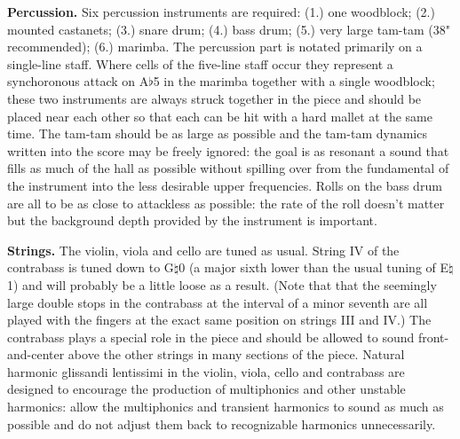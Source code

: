 \textbf{Percussion.} Six percussion instruments are required: (1.) one
woodblock; (2.) mounted castanets; (3.) snare drum; (4.) bass drum; (5.) very
large tam-tam (38" recommended); (6.) marimba. The percussion part is notated
primarily on a single-line staff. Where cells of the five-line staff occur they
represent a synchoronous attack on A$\flat$5 in the marimba together with a
single woodblock; these two instruments are always struck together in the piece
and should be placed near each other so that each can be hit with a hard mallet
at the same time. The tam-tam should be as large as possible and the tam-tam
dynamics written into the score may be freely ignored: the goal is as resonant
a sound that fills as much of the hall as possible without spilling over from
the fundamental of the instrument into the less desirable upper frequencies.
Rolls on the bass drum are all to be as close to attackless as possible: the
rate of the roll doesn't matter but the background depth provided by the
instrument is important.

\textbf{Strings.} The violin, viola and cello are tuned as usual. String IV of
the contrabass is tuned down to G$\natural$0 (a major sixth lower than the
usual tuning of E$\natural$1) and will probably be a little loose as a result.
(Note that that the seemingly large double stops in the contrabass at the
interval of a minor seventh are all played with the fingers at the exact same
position on strings III and IV.) The contrabass plays a special role in the
piece and should be allowed to sound front-and-center above the other strings
in many sections of the piece. Natural harmonic glissandi lentissimi in the
violin, viola, cello and contrabass are designed to encourage the production of
multiphonics and other unstable harmonics: allow the multiphonics and transient
harmonics to sound as much as possible and do not adjust them back to
recognizable harmonics unnecessarily.
